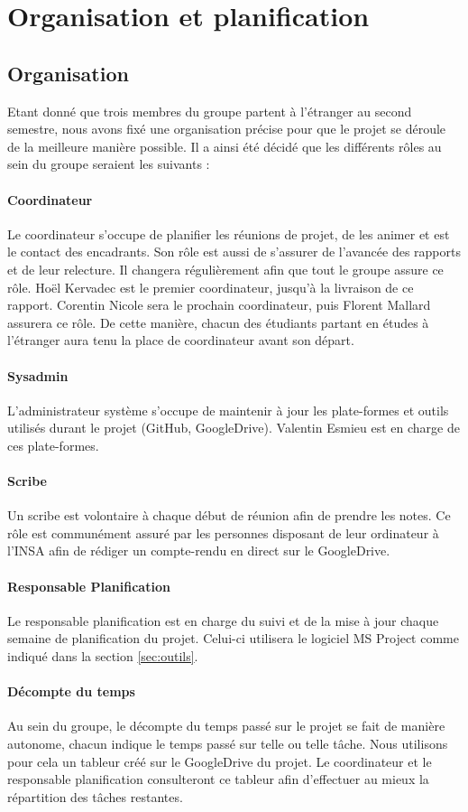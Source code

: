 \section{Organisation et planification}
	\subsection{Organisation}
	    Etant donné que trois membres du groupe partent à l'étranger au second semestre, nous avons fixé une organisation précise pour que le projet se déroule de la meilleure manière possible. Il a ainsi été décidé que les différents rôles au sein du groupe seraient les suivants :
	    \paragraph{Coordinateur} Le coordinateur s'occupe de planifier les réunions de projet, de les animer et est le contact des encadrants. Son rôle est aussi de s'assurer de l'avancée des rapports et de leur relecture. Il changera régulièrement afin que tout le groupe assure ce rôle. Hoël Kervadec est le premier coordinateur, jusqu'à la livraison de ce rapport. Corentin Nicole sera le prochain coordinateur, puis Florent Mallard assurera ce rôle. De cette manière, chacun des étudiants partant en études à l'étranger aura tenu la place de coordinateur avant son départ.
	    \paragraph{Sysadmin} L'administrateur système s'occupe de maintenir à jour les plate-formes et outils utilisés durant le projet (GitHub, GoogleDrive). Valentin Esmieu est en charge de ces plate-formes.
	    \paragraph{Scribe} Un scribe est volontaire à chaque début de réunion afin de prendre les notes. Ce rôle est communément assuré par les personnes disposant de leur ordinateur à l'INSA afin de rédiger un compte-rendu en direct sur le GoogleDrive.
	    \paragraph{Responsable Planification} Le responsable planification est en charge du suivi et de la mise à jour chaque semaine de planification du projet. Celui-ci utilisera le logiciel MS Project comme indiqué dans la section \ref{sec:outils}.
	    \paragraph{Décompte du temps} Au sein du groupe, le décompte du temps passé sur le projet se fait de manière autonome, chacun indique le temps passé sur telle ou telle tâche. Nous utilisons pour cela un tableur créé sur le GoogleDrive du projet. Le coordinateur et le responsable planification consulteront ce tableur afin d'effectuer au mieux la répartition des tâches restantes.

